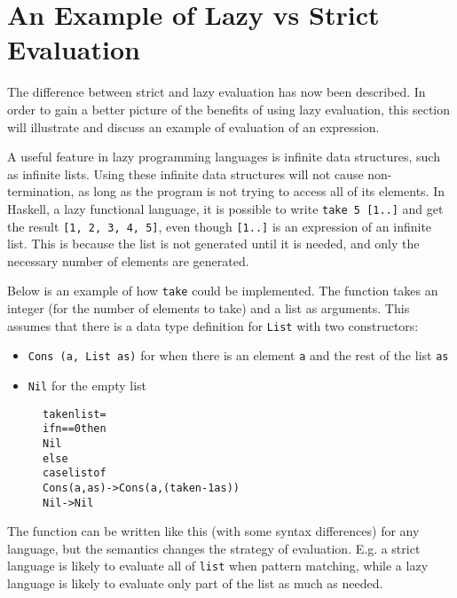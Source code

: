 \section{An Example of Lazy vs Strict Evaluation}
\label{intro:Example}
The difference between strict and lazy evaluation has now been described.
In order to gain a better picture of the benefits of using lazy evaluation,
this section will illustrate and discuss an example of evaluation of an
expression.

A useful feature in lazy programming languages is
infinite data structures, such as infinite lists. Using
these infinite data structures will not cause non-termination, as long as the
program is not trying to access all of its elements. In Haskell, a lazy
functional language, it is possible to write \texttt{take 5 [1..]} and get the
result \texttt{[1, 2, 3, 4, 5]}, even though \texttt{[1..]} is
an expression of an infinite list. This is because the list is not generated
until it is needed, and only the necessary number of elements are generated.

Below is an example of how \texttt{take} could be implemented. The function
takes an integer (for the number of elements to take) and a list as arguments.
This assumes that there is a data type definition for \texttt{List} with two
constructors:
\begin{itemize}
  \item \texttt{Cons (a, List as)} for when there is an element \texttt{a} and the rest of the list \texttt{as}
  \item \texttt{Nil} for the empty list
\end{itemize}

\begin{figure}[H]
\begin{alltt}
take n list =
  if n == 0 then
    Nil
  else
    case list of
      Cons (a, as) -> Cons (a, (take n-1 as))
      Nil          -> Nil
\end{alltt}
\end{figure}

\noindent The function can be written like this (with some syntax differences)
for any language, but the semantics
changes the strategy of evaluation. E.g. a strict language is likely to evaluate
all of \texttt{list} when pattern matching, while a lazy language is likely to
evaluate only part of the list as much as needed. 
